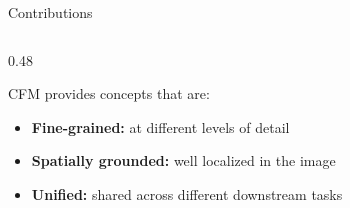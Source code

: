 \documentclass[aspectratio=169,11pt]{beamer}
\begin{document}
\begin{frame}{Contributions}
    \begin{columns}[onlytextwidth]
        \begin{column}{0.48\textwidth}
            \begin{block}{\small CFM provides concepts that are:}
                \begin{itemize}
                    \small
                    \item \textbf{Fine-grained:} at different levels of detail
                    \item \textbf{Spatially grounded:} well localized in the image
                    \item \textbf{Unified:} shared across different downstream tasks
                \end{itemize}
            \end{block}
        \end{column}


\end{columns}
\end{frame}
\end{document}
